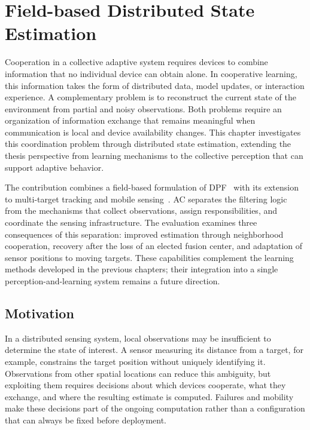 
\chapter{Field-based Distributed State Estimation}
\label{chap:distributed-state-estimation}
\minitoc



Cooperation in a collective adaptive system requires devices 
 to combine information that no individual device can obtain alone.
%
In cooperative learning, 
 this information takes the form of distributed data, 
 model updates, or interaction experience.
%
A complementary problem is to reconstruct the current state 
 of the environment from partial and noisy observations.
%
Both problems require an organization of information exchange that remains meaningful when communication is local 
 and device availability changes.
%
This chapter investigates this coordination problem through distributed state estimation, 
 extending the thesis perspective from learning mechanisms to the collective perception that can support adaptive behavior.

The contribution combines a field-based formulation of \gls{DPF}~\cite{DBLP:journals/corr/abs-2606-18483} 
 with its extension to multi-target tracking and mobile sensing~\cite{DBLP:conference/acsos/CortecchiaDCCV}.
%
\gls{AC} separates the filtering logic from the mechanisms that collect observations, 
 assign responsibilities, and coordinate the sensing infrastructure.
%
The evaluation examines three consequences of this separation: 
 improved estimation through neighborhood cooperation, recovery after the loss of an elected fusion center, 
 and adaptation of sensor positions to moving targets.
%
These capabilities complement the learning methods developed in the previous chapters; 
 their integration into a single perception-and-learning system remains a future direction.

\section{Motivation}
\label{sec:dpf-motivation}

In a distributed sensing system, 
 local observations may be insufficient to determine the state of interest.
%
A sensor measuring its distance from a target, for example, 
 constrains the target position without uniquely identifying it.
%
Observations from other spatial locations can reduce this ambiguity, 
 but exploiting them requires decisions about which devices cooperate, what they exchange, 
 and where the resulting estimate is computed.
%
Failures and mobility make these decisions part of the ongoing computation rather than a configuration 
 that can always be fixed before deployment.

